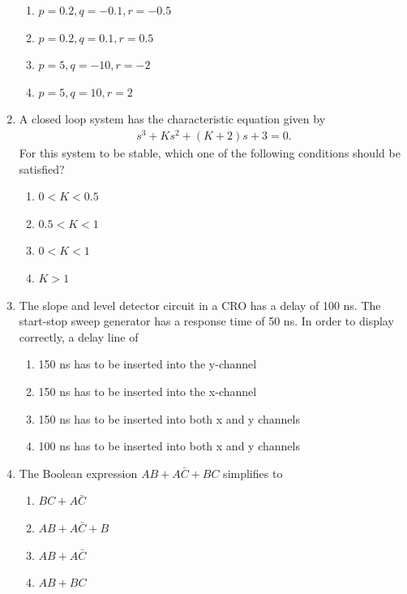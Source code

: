 \documentclass[journal,12pt,onecolumn]{IEEEtran}
\theoremstyle{remark}
\begin{document}
\begin{enumerate}
\begin{multicols}{2}
\begin{enumerate}
\item $p = 0.2, q = -0.1, r = -0.5$  
\item $p = 0.2, q = 0.1, r = 0.5$  
\item $p = 5, q = -10, r = -2$  
\item $p = 5, q = 10, r = 2$  
\end{enumerate}
\end{multicols}

\item A closed loop system has the characteristic equation given by
\begin{align*}
    s^3 + Ks^2 + (K+2)s + 3 = 0.
\end{align*}
For this system to be stable, which one of the following conditions should be satisfied?  

\begin{multicols}{2}
\begin{enumerate}
\item $0 < K < 0.5$  
\item $0.5 < K < 1$  
\item $0 < K < 1$  
\item $K > 1$  
\end{enumerate}
\end{multicols}

\item The slope and level detector circuit in a CRO has a delay of 100 ns. The start-stop sweep generator has a response time of 50 ns. In order to display correctly, a delay line of  

\begin{multicols}{2}
\begin{enumerate}
\item 150 ns has to be inserted into the y-channel  
\item 150 ns has to be inserted into the x-channel  
\item 150 ns has to be inserted into both x and y channels  
\item 100 ns has to be inserted into both x and y channels  
\end{enumerate}
\end{multicols}

\item The Boolean expression $AB + A\bar{C} + BC$ simplifies to  

\begin{multicols}{2}
\begin{enumerate}
\item $BC + A\bar{C}$  
\item $AB + A\bar{C} + B$  
\item $AB + A\bar{C}$  
\item $AB + BC$  
\end{enumerate}
\end{multicols}


\end{enumerate}
\end{document}
